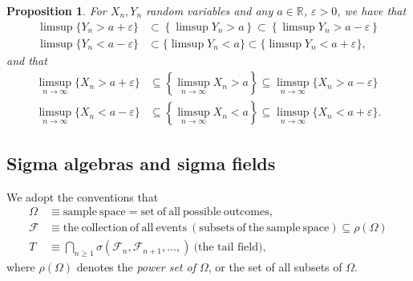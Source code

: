\documentclass[12pt,reqno]{article}
\renewcommand{\emph}[1]{\textit{#1}}
\theoremstyle{plain}
\newtheorem{prop}[theorem]{Proposition}
\theoremstyle{definition}
\begin{document}
\begin{prop} 
\label{prop_limsups_of_sets_containment_idents} 
For $X_n,Y_n$ random variables and any $a \in \mathbb{R}$, 
$\varepsilon > 0$, we have that 
\begin{align*} 
\limsup \{Y_n > a+\varepsilon\} & \subset \left\{\limsup Y_n > a\right\} 
     \subset \left\{\limsup Y_n > a - \varepsilon\right\} \\ 
\limsup \{Y_n < a-\varepsilon\} & \subset \{\limsup Y_n < a\} \subset 
     \{\limsup Y_n < a+\varepsilon\}, 
\end{align*} 
and that 
\begin{align*} 
\limsup_{n \rightarrow \infty} \{X_n > a+\varepsilon\} & \subseteq 
     \left\{\limsup_{n \rightarrow \infty} X_n > a\right\} \subseteq 
     \limsup_{n \rightarrow \infty} \{X_n > a-\varepsilon\} \\ 
\limsup_{n \rightarrow \infty} \{X_n < a-\varepsilon\} & \subseteq 
     \left\{\limsup_{n \rightarrow \infty} X_n < a\right\} \subseteq 
     \limsup_{n \rightarrow \infty} \{X_n < a+\varepsilon\}. 
\end{align*} 
\end{prop} 

\subsection{Sigma algebras and sigma fields} 

We adopt the conventions that 
\begin{align*} 
\Omega & \equiv \mathrm{sample\ space} = 
  \mathrm{set\ of\ all\ possible\ outcomes}, \\ 
\mathcal{F} & \equiv \mathrm{the\ collection\ of\ all\ events\ (subsets\ 
  of\ the\ sample\ space)} \subseteq \rho(\Omega) \\ 
T & \equiv \bigcap_{n \geq 1} \sigma\left(\mathcal{F}_n, \mathcal{F}_{n+1}, \ldots, \right)\ \text{(the tail field)}, 
\end{align*} 
where $\rho(\Omega)$ denotes the \emph{power set of $\Omega$}, or the 
set of all subsets of $\Omega$. 
\end{document}
